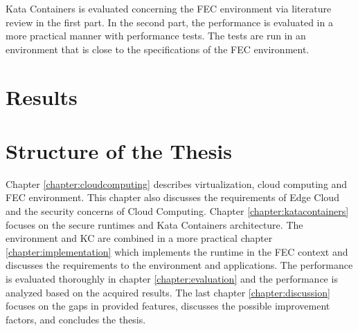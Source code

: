 Kata Containers is evaluated concerning the FEC environment via literature review in the first part. In the second part, the performance is evaluated in a more practical manner with performance tests. The tests are run in an environment that is close to the specifications of the FEC environment.

\section{Results}
\label{section:intro_results}

\section{Structure of the Thesis}
\label{section:intro_structure}

Chapter \ref{chapter:cloudcomputing} describes virtualization, cloud computing and FEC environment. This chapter also discusses the requirements of Edge Cloud and the security concerns of Cloud Computing. Chapter \ref{chapter:katacontainers} focuses on the secure runtimes and Kata Containers architecture. The environment and KC are combined in a more practical chapter \ref{chapter:implementation} which implements the runtime in the FEC context and discusses the requirements to the environment and applications. The performance is evaluated thoroughly in chapter \ref{chapter:evaluation} and the performance is analyzed based on the acquired results. The last chapter \ref{chapter:discussion} focuses on the gaps in provided features, discusses the possible improvement factors, and concludes the thesis.


